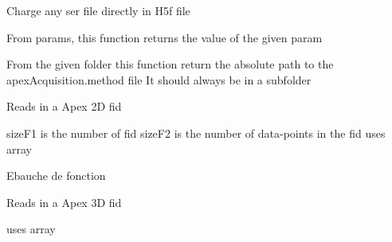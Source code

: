 \documentclass[letterpaper,10pt,openany,oneside]{sphinxmanual}
\begin{document}

\begin{fulllineitems}
\label{rst/code:File.Solarix.Ser2D_to_FTICRFile}
Charge any ser file directly in H5f file

\end{fulllineitems}


\begin{fulllineitems}
\label{rst/code:File.Solarix.get_param}
From params, this function returns the  value of the given param

\end{fulllineitems}


\begin{fulllineitems}
\label{rst/code:File.Solarix.locate_acquisition}
From the given folder this function return the absolute path to the apexAcquisition.method file
It should always be in a subfolder

\end{fulllineitems}


\begin{fulllineitems}
\label{rst/code:File.Solarix.read_2D}
Reads in a Apex 2D fid

sizeF1 is the number of fid
sizeF2 is the number of data-points in the fid
uses array

\end{fulllineitems}


\begin{fulllineitems}
\label{rst/code:File.Solarix.read_3D}
Ebauche de fonction

Reads in a Apex 3D fid

uses array

\end{fulllineitems}
\end{document}
